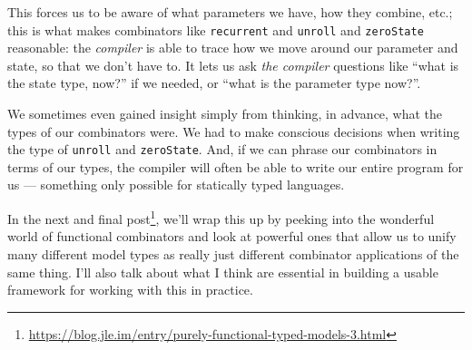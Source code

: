 \documentclass[]{article}
\renewcommand{\href}[2]{#2\footnote{\url{#1}}}
\begin{document}
\begin{enumerate}
  This forces us to be aware of what parameters we have, how they combine, etc.;
  this is what makes combinators like \texttt{recurrent} and \texttt{unroll} and
  \texttt{zeroState} reasonable: the \emph{compiler} is able to trace how we
  move around our parameter and state, so that we don't have to. It lets us ask
  \emph{the compiler} questions like ``what is the state type, now?'' if we
  needed, or ``what is the parameter type now?''.

  We sometimes even gained insight simply from thinking, in advance, what the
  types of our combinators were. We had to make conscious decisions when writing
  the type of \texttt{unroll} and \texttt{zeroState}. And, if we can phrase our
  combinators in terms of our types, the compiler will often be able to write
  our entire program for us --- something only possible for statically typed
  languages.
\end{enumerate}

In the
\href{https://blog.jle.im/entry/purely-functional-typed-models-3.html}{next and
final post}, we'll wrap this up by peeking into the wonderful world of
functional combinators and look at powerful ones that allow us to unify many
different model types as really just different combinator applications of the
same thing. I'll also talk about what I think are essential in building a usable
framework for working with this in practice.
\end{document}
